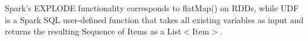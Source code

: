 Spark’s EXPLODE functionality corresponds to flatMap() on RDDs, while UDF is a Spark SQL user-defined function that takes all existing variables as input and returns the resulting Sequence of Items as a List$<$Item$>$.

